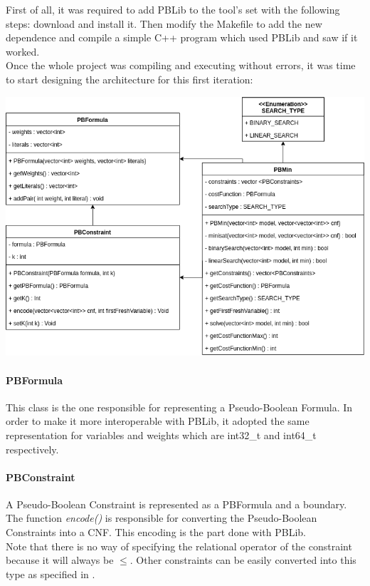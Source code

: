 First of all, it was required to add PBLib to the tool's set with the following steps: download and install it. Then modify the Makefile to add the new dependence and compile a simple C++ program which used PBLib and saw if it worked.  \\
Once the whole project was compiling and executing without errors, it was time to start designing the architecture for this first iteration: \\

\begin{center}
	\includegraphics[width=1\textwidth]{Figures/Iteration_1_Architecture.png}
	\label{it1arch}
\end{center}


\paragraph{PBFormula}

This class is the one responsible for representing a Pseudo-Boolean Formula. In order to make it more interoperable with PBLib, it adopted the same representation for variables and weights which are int32\_t and int64\_t respectively.  




\paragraph{PBConstraint} 

A Pseudo-Boolean Constraint is represented as a PBFormula and a boundary.  \\
The function \emph{encode()} is responsible for converting the Pseudo-Boolean Constraints into a CNF. This encoding is the part done with PBLib. \\
Note that there is no way of specifying the relational operator of the constraint because it will always be $\leq$.  Other constraints can be easily converted into this type as specified in \cite{Abio}.


